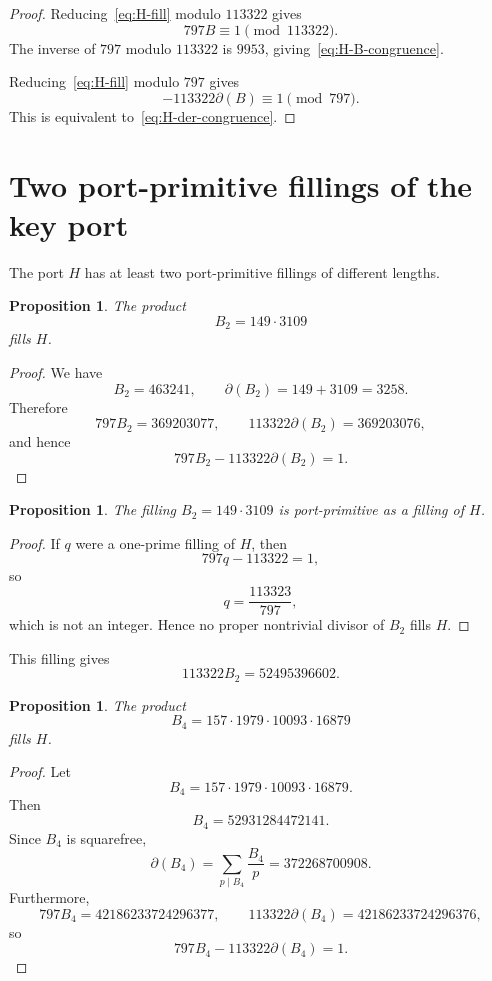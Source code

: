 \documentclass[11pt]{amsart}
\theoremstyle{plain}
\newtheorem{proposition}[theorem]{Proposition}
\theoremstyle{definition}
\theoremstyle{remark}
\newcommand{\dd}{\partial}
\begin{document}
\begin{proof}
Reducing~\eqref{eq:H-fill} modulo $113322$ gives
\[
        797B\equiv1\pmod{113322}.
\]
The inverse of $797$ modulo $113322$ is $9953$, giving~\eqref{eq:H-B-congruence}.

Reducing~\eqref{eq:H-fill} modulo $797$ gives
\[
        -113322\dd(B)\equiv1\pmod{797}.
\]
This is equivalent to~\eqref{eq:H-der-congruence}.
\end{proof}

\section{Two port-primitive fillings of the key port}

The port $H$ has at least two port-primitive fillings of different lengths.

\begin{proposition}\label{prop:H-B2}
The product
\[
        B_2=149\cdot3109
\]
fills $H$.
\end{proposition}

\begin{proof}
We have
\[
        B_2=463241,
        \qquad
        \dd(B_2)=149+3109=3258.
\]
Therefore
\[
        797B_2=369203077,
        \qquad
        113322\dd(B_2)=369203076,
\]
and hence
\[
        797B_2-113322\dd(B_2)=1.
\]
\end{proof}

\begin{proposition}\label{prop:H-B2-primitive}
The filling $B_2=149\cdot3109$ is port-primitive as a filling of $H$.
\end{proposition}

\begin{proof}
If $q$ were a one-prime filling of $H$, then
\[
        797q-113322=1,
\]
so
\[
        q=\frac{113323}{797},
\]
which is not an integer.  Hence no proper nontrivial divisor of $B_2$ fills $H$.
\end{proof}

This filling gives
\[
        113322B_2=52495396602.
\]

\begin{proposition}\label{prop:H-B4}
The product
\[
        B_4=157\cdot1979\cdot10093\cdot16879
\]
fills $H$.
\end{proposition}

\begin{proof}
Let
\[
        B_4=157\cdot1979\cdot10093\cdot16879.
\]
Then
\[
        B_4=52931284472141.
\]
Since $B_4$ is squarefree,
\[
        \dd(B_4)=\sum_{p\mid B_4}\frac{B_4}{p}=372268700908.
\]
Furthermore,
\[
        797B_4=42186233724296377,
        \qquad
        113322\dd(B_4)=42186233724296376,
\]
so
\[
        797B_4-113322\dd(B_4)=1.
\]
\end{proof}
\end{document}
